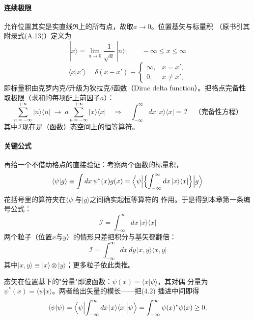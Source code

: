 \paragraph{连续极限}
允许位置其实是实直线$\Re$上的所有点，故取$a\to0$。位置基矢与标量积
（原书引其附录式(A.13)）定义为
\begin{equation*}
|x\rangle=\lim_{a\to0}\frac{1}{\sqrt{a}}\,|n\rangle;\qquad
-\infty\leq x\leq\infty
\end{equation*}
\begin{equation*}
\langle x|x'\rangle=\delta(x-x')\equiv
\begin{cases}
\infty, & x=x',\\
0, & x\neq x',
\end{cases}
\end{equation*}
即标量积由克罗内克$\delta$升级为狄拉克$\delta$函数（Dirac delta
function）。把格点完备性取极限（求和的每项配上前因子$a$）：
\begin{equation*}
\sum_{n=-\infty}^{+\infty}|n\rangle\langle n|
\;\to\;
a\sum_{n=-\infty}^{+\infty}|x\rangle\langle x|
\quad\Longrightarrow\quad
\int_{-\infty}^{\infty}dx\,|x\rangle\langle x|=\mathcal{I}
\quad\text{（完备性方程）}
\end{equation*}
其中$\mathcal{I}$现在是（函数）态空间上的恒等算符。

\paragraph{关键公式}
再给一个不借助格点的直接验证：考察两个函数的标量积，
\begin{equation*}
\langle\psi|g\rangle\equiv\int dx\,\psi^{*}(x)g(x)
=\Bigl\langle\psi\Bigl|
\Bigl\{\int_{-\infty}^{\infty}dx\,|x\rangle\langle x|\Bigr\}
\Bigr|g\Bigr\rangle
\end{equation*}
花括号里的算符夹在$\langle\psi|$与$|g\rangle$之间确实起恒等算符的
作用。于是得到本章第一条编号公式：
\begin{equation*}
\mathcal{I}=\int_{-\infty}^{\infty}dx\,|x\rangle\langle x|
\tag{4.2}
\end{equation*}
两个粒子（位置$x$与$y$）的情形只差把积分与基矢都翻倍：
\begin{equation*}
\mathcal{I}=\int_{-\infty}^{\infty}dx\,dy\,|x,y\rangle\langle x,y|
\tag{4.3}
\end{equation*}
其中$|x,y\rangle\equiv|x\rangle\otimes|y\rangle$；更多粒子依此类推。

态矢在位置基下的"分量"即波函数：$\psi(x)=\langle x|\psi\rangle$，其对偶
分量为$\psi^{*}(x)=\langle\psi|x\rangle$。两者给出矢量的模长——把(4.2)
插进中间即得
\begin{equation*}
\langle\psi|\psi\rangle
=\Bigl\langle\psi\Bigl|\int_{-\infty}^{\infty}dx\,|x\rangle\langle x|
\Bigr|\psi\Bigr\rangle
=\int_{-\infty}^{\infty}\psi(x)^{*}\psi(x)\geq0.
\end{equation*}

